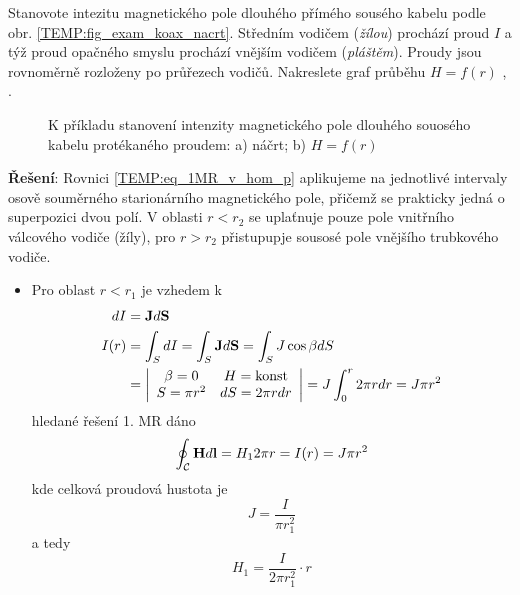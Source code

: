       \begin{example}\label{TEMP:ex_koax_H}
        Stanovote intezitu magnetického pole dlouhého přímého sousého kabelu podle obr.
        \ref{TEMP:fig_exam_koax_nacrt}. Středním vodičem (\emph{žílou}) prochází proud $I$ a týž
        proud opačného smyslu prochází vnějším vodičem (\emph{pláštěm}). Proudy jsou rovnoměrně
        rozloženy po průřezech vodičů. Nakreslete graf průběhu $H = f(r)$ \cite[s.~92]{Dufek1970},
        \cite[s.~195]{Kotlan1999}.
        
         \begin{figure}[ht!]
           \centering
           \caption[Pole dlouhého sousého kabelu]{K příkladu stanovení intenzity magnetického pole
                   dlouhého souosého kabelu protékaného proudem: a) náčrt; b) $H=f(r)$}
           \label{TEMP:fig_exam_koax}
         \end{figure}
                 
        
       \textbf{Řešení}: Rovnici \ref{TEMP:eq_1MR_v_hom_p} aplikujeme na jednotlivé intervaly osově
        souměrného starionárního magnetického pole, přičemž se prakticky jedná o superpozici dvou
        polí. V oblasti $r<r_2$ se uplaťnuje pouze pole vnitřního válcového vodiče (žíly), pro
        $r>r_2$ přistupupje sousosé pole vnějšího trubkového vodiče.
        \begin{itemize}
  		  \item Pro oblast $r<r_1$ je vzhedem k 
  		       \begin{align*}
				  dI   &= \mathbf{J}d\mathbf{S} \\
  				  I(r) &= \int_S dI = \int_S \mathbf{J}d\mathbf{S} = \int_S J\cos\beta dS \\
  				       &= \left|\begin{array}{cc}
                                  \beta = 0 & H = \text{konst} \\
                                  S = \pi r^2 & dS = 2\pi rdr \\
                                \end{array}\right| = J\int_0^r 2\pi rdr = J\pi r^2
			   \end{align*}
	 		   hledané řešení 1. MR dáno 
	 		   $$\oint_\mathcal{C}\mathbf{H}d\mathbf{l} = H_1 2\pi r = I(r) = J\pi r^2$$ kde celková proudová
	 		   hustota je  $$J = \frac{I}{\pi r_1^2}$$ a tedy $$H_1 = \frac{I}{2\pi r_1^2}\cdot r$$
			   

\end{itemize}
\end{example}
